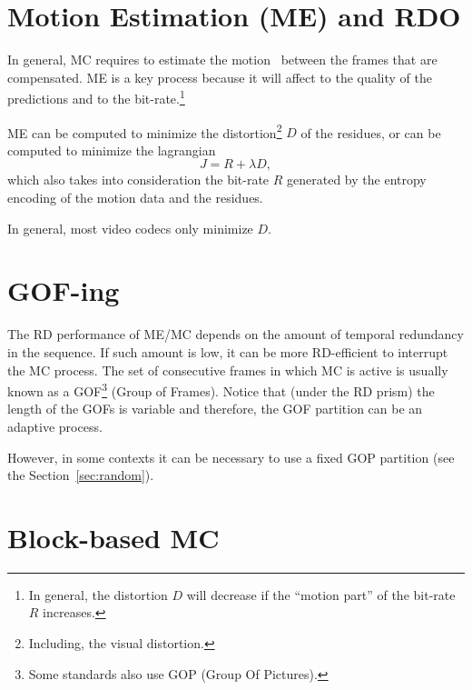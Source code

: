 
\section{Motion Estimation (ME) and RDO}

In general, MC requires to estimate the motion~\cite{vruiz__ME}
between the frames that are compensated. ME is a key process because
it will affect to the quality of the predictions and to the
bit-rate.\footnote{In general, the distortion $D$ will decrease if the
  ``motion part'' of the bit-rate $R$ increases.}

ME can be computed to minimize the distortion\footnote{Including, the
  visual distortion.} $D$ of the residues, or can be computed to
minimize the lagrangian
\begin{equation}
  J = R + \lambda D,
\end{equation}
which also takes into consideration the bit-rate $R$ generated by the
entropy encoding of the motion data and the residues.

In general, most video codecs only minimize $D$.


\section{GOF-ing}

The RD performance of ME/MC depends on the amount of temporal
redundancy in the sequence. If such amount is low, it can be more
RD-efficient to interrupt the MC process. The set of consecutive
frames in which MC is active is usually known as a GOF\footnote{Some
  standards also use GOP (Group Of Pictures).} (Group of
Frames). Notice that (under the RD prism) the length of the GOFs is
variable and therefore, the GOF partition can be an adaptive process.

However, in some contexts it can be necessary to use a fixed GOP
partition (see the Section~\ref{sec:random}).

\section{Block-based MC}

